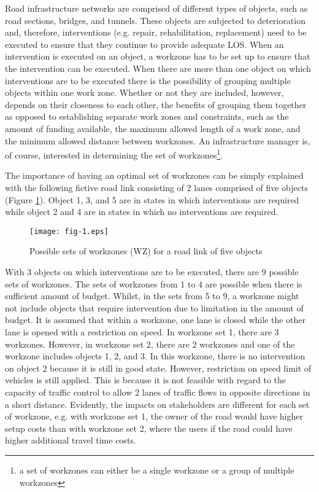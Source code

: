 \documentclass[a4paper,3p,times,authoryear]{elsarticle}
\begin{document}
Road infrastructure networks are comprised of different types of objects, such as road
sections, bridges, and tunnels. These objects are subjected to deterioration and,
therefore, interventions (e.g. repair, rehabilitation, replacement) need to be
executed to ensure that they continue to provide adequate LOS. When
an intervention is executed on an object, a workzone has to be set up to ensure
that the intervention can be executed. When there are more than one object on
which interventions are to be executed there is the possibility of grouping
multiple objects within one work zone. Whether or not they are included, however,
depends on their closeness to each other, the benefits of grouping them together
as opposed to establishing separate work zones and constraints, such as the
amount of funding available, the maximum allowed length of a work zone, and the
minimum allowed distance between workzones. An infrastructure manager is, of
course, interested in determining the set of workzones\footnote{a set of
workzones can either be a single workzone or a group of multiple workzones}.

The importance of having an optimal set of workzones can be simply explained
with the following fictive road link consisting of 2 lanes comprised of five
objects (Figure \ref{fig:1}). Object 1, 3, and 5 are in states in which
interventions are required while object 2 and 4 are in states in which no
interventions are required.

\begin{figure}[H]
\begin{center}
\texttt{[image: fig-1.eps]}
\caption{Possible sets of workzones (WZ) for a road link of five
objects}\label{fig:1}
\end{center}
\end{figure}

With 3 objects on which interventions are to be executed, there are 9 possible
sets of workzones. The sets of workzones from 1 to 4 are possible when there is
sufficient amount of budget. Whilst, in the sets from 5 to 9, a workzone might
not include objects that require intervention due to limitation in the amount of
budget. It is assumed that within a workzone, one lane is closed while the other
lane is opened with a restriction on speed. In workzone set 1, there are 3
workzones. However, in workzone set 2, there are 2 workzones and one of the
workzone includes objects 1, 2, and 3. In this workzone, there is no intervention
on object 2 because it is still in good state. However, restriction on speed
limit of vehicles is still applied. This is because it is not feasible with
regard to the capacity of traffic control to allow 2 lanes of traffic flows in
opposite directions in a short distance. Evidently, the impacts on stakeholders
are different for each set of workzone, e.g. with workzone set 1, the owner of
the road would have higher setup costs than with workzone set 2, where the users
if the road could have higher additional travel time costs.
\end{document}
